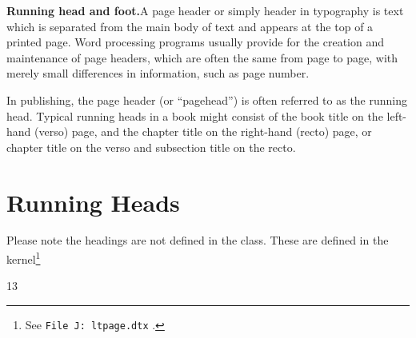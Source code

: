 \textbf{Running head and foot.}\quad A page header or simply header in typography is text which is separated from the main body of text and appears at the top of a printed page. Word processing programs usually provide for the creation and maintenance of page headers, which are often the same from page to page, with merely small differences in information, such as page number.

In publishing, the page header (or ``pagehead'') is often referred to as the running head. Typical running heads in a book might consist of the book title on the left-hand (verso) page, and the chapter title on the right-hand (recto) page, or chapter title on the verso and subsection title on the recto.


\section{Running Heads}

\begin{teX}
\if@twoside
  \def\ps@headings{%
      \let\@oddfoot\@empty\let\@evenfoot\@empty
      \def\@evenhead{\thepage\hfil\slshape\leftmark}%
      \def\@oddhead{{\slshape\rightmark}\hfil\thepage}%
      \let\@mkboth\markboth
  \def\chaptermark##1{%
      \markboth {\MakeUppercase{%
        \ifnum \c@secnumdepth >\m@ne
          \if@mainmatter
            \@chapapp\ \thechapter. \ %
          \fi
        \fi
        ##1}}{}}%
    \def\sectionmark##1{%
      \markright {\MakeUppercase{%
        \ifnum \c@secnumdepth >\z@
          \thesection. \ %
        \fi
        ##1}}}}
\else
  \def\ps@headings{%
    \let\@oddfoot\@empty
    \def\@oddhead{{\slshape\rightmark}\hfil\thepage}%
    \let\@mkboth\markboth
    \def\chaptermark##1{%
      \markright {\MakeUppercase{%
        \ifnum \c@secnumdepth >\m@ne
          \if@mainmatter
            \@chapapp\ \thechapter. \ %
          \fi
        \fi
        ##1}}}}
\fi
\def\ps@myheadings{%
    \let\@oddfoot\@empty\let\@evenfoot\@empty
    \def\@evenhead{\thepage\hfil\slshape\leftmark}%
    \def\@oddhead{{\slshape\rightmark}\hfil\thepage}%
    \let\@mkboth\@gobbletwo
    \let\chaptermark\@gobble
    \let\sectionmark\@gobble
    }
\end{teX}


Please note the  headings are not defined in the class. These are defined in the \latex kernel\footnote{See \texttt{File J: ltpage.dtx} \pageref{kernel:ltpgage}.}

\begin{teX}
13 \def\ps@plain{\let\@mkboth\@gobbletwo
14 \let\@oddhead\@empty\def\@oddfoot{\reset@font\hfil\thepage
15 \hfil}\let\@evenhead\@empty\let\@evenfoot\@oddfoot}
\end{teX}



